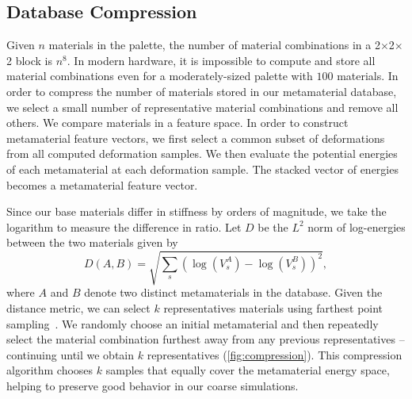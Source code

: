 \subsection{Database Compression}
\label{sec:compression}
Given $n$ materials in the palette, the number of material combinations in a 2$\times$2$\times$2 block is $n^8$. In modern hardware, it is impossible to compute and store all material combinations even for a moderately-sized palette with $100$ materials.
In order to compress the number of materials stored in our metamaterial database, we select a small number of representative material combinations and remove all others. We compare materials in a feature space. In order to construct metamaterial feature vectors, we first select a common subset of deformations from all computed deformation samples. We then evaluate the potential energies of each metamaterial at each deformation sample. The stacked vector of energies becomes a metamaterial feature vector. 

Since our base materials differ in stiffness by orders of magnitude, we take the logarithm to measure the difference in ratio.
Let $D$ be the $L^2$ norm of log-energies between the two materials given by
\begin{equation}
D(A,B)=\sqrt{\sum_s (\log(V^{A}_{s})-\log(V^{B}_{s}))^2},
\end{equation} where $A$ and $B$ denote two distinct metamaterials in the database. 
Given the distance metric, we can select $k$ representatives materials using farthest point sampling~\cite{eldar1997farthest}. We randomly choose an initial metamaterial and then repeatedly select the material combination furthest away from any previous representatives -- continuing until we obtain $k$ representatives (\autoref{fig:compression}). This compression algorithm chooses $k$ samples that equally cover the metamaterial energy space, helping to preserve good behavior in our coarse simulations. 
